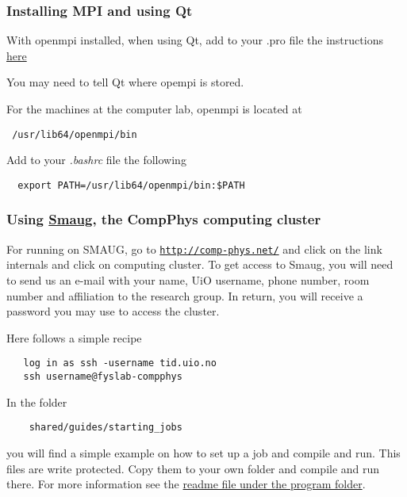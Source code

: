 \documentclass{beamer}
\begin{document}
\begin{frame}
\frametitle{Installing MPI and using Qt}

\begin{block}{}
With openmpi installed, when using Qt, add to your .pro file the instructions \href{{http://dragly.org/2012/03/14/developing-mpi-applications-in-qt-creator/}}{here}

You may need to tell Qt where opempi is stored.

For the machines at the computer lab, openmpi is located  at 
\begin{verbatim}
 /usr/lib64/openmpi/bin
\end{verbatim}
Add to your \emph{.bashrc} file the following
\begin{verbatim}
  export PATH=/usr/lib64/openmpi/bin:$PATH 
\end{verbatim}
\end{block}
\end{frame}

\begin{frame}
\frametitle{Using \href{{http://comp-phys.net/cluster-info/using-smaug/}}{Smaug}, the CompPhys computing cluster}

\begin{block}{}
For running on SMAUG, go to \href{{http://comp-phys.net/}}{\nolinkurl{http://comp-phys.net/}} and click on the link internals and click on
computing cluster.
To get access to Smaug, you will need to send us an e-mail with your name, UiO username, phone number, room number and affiliation to the research group. In return, you will receive a password you may use to access the cluster.

Here follows a simple recipe
\begin{verbatim}
   log in as ssh -username tid.uio.no
   ssh username@fyslab-compphys
\end{verbatim}
In the folder 
\begin{verbatim}
    shared/guides/starting_jobs 
\end{verbatim}
you will find a simple example on how to set up a job and compile and run.
This files are write protected. Copy them to your own folder and compile and run there. 
For more information see the \href{{https://github.com/CompPhysics/ComputationalPhysics2/tree/gh-pages/doc/Programs/ParallelizationMPI}}{readme file under the program folder}. 
\end{block}
\end{frame}
\end{document}
